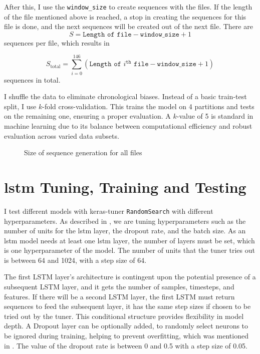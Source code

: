 After this, I use the \texttt{window\_size} to create sequences with the files.
If the length of the file mentioned above is reached, a stop in creating the sequences for this file is done, and the next sequences will be created out of the next file.
There are 
\[S = \texttt{Length of file} - \texttt{window\_size} + 1\] 
sequences per file, which results in 

\[
    S_{\text{total}} = \sum_{i=0}^{146} (\texttt{Length of } i^{\texttt{th}} \texttt{ file} - \texttt{window\_size} + 1)
\]
sequences in total.

I shuffle the data to eliminate chronological biases. 
Instead of a basic train-test split, I use $k$-fold cross-validation.
This trains the model on 4 partitions and tests on the remaining one, ensuring a proper evaluation.
A $k$-value of 5 is standard in machine learning due to its balance between computational efficiency and robust evaluation across varied data subsets.

\begin{figure}[h]
    \centering
    
    \caption{Size of sequence generation for all files}
    \label{fig:sequence_generation}
\end{figure}

\section{\ac{lstm} Tuning, Training and Testing}

I test different models with keras-tuner \texttt{RandomSearch} with different hyperparameters.
As described in , we are tuning hyperparameters such as the number of units for the \ac{lstm} layer, the dropout rate, and the batch size.
As an \ac{lstm} model needs at least one \ac{lstm} layer, the number of layers must be set, which is one hyperparameter of the model.
The number of units that the tuner tries out is between 64 and 1024, with a step size of 64.

The first LSTM layer's architecture is contingent upon the potential presence of a subsequent LSTM layer, and it gets the number of samples, timesteps, and features.
If there will be a second LSTM layer, the first LSTM must return sequences to feed the subsequent layer, it has the same step sizes if chosen to be tried out by the tuner.
This conditional structure provides flexibility in model depth.
A Dropout layer can be optionally added, to randomly select neurons to be ignored during training, helping to prevent overfitting, which was mentioned in .
The value of the dropout rate is between 0 and 0.5 with a step size of 0.05.

